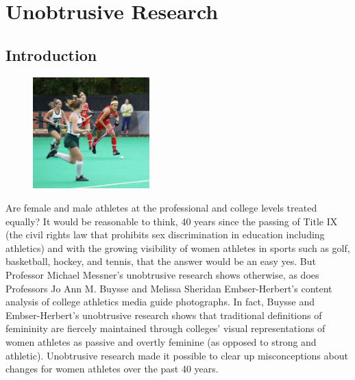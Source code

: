 \chapter{Unobtrusive Research}\label{ch12:unobtrusive}

\section{Introduction}

\begin{figure}
	\centering
	\includegraphics[width=0.4\textwidth]{gfx/12-women_hockey} 
\end{figure}

Are female and male athletes at the professional and college levels treated equally? It would be reasonable to think, 40 years since the passing of Title IX (the civil rights law that prohibits sex discrimination in education including athletics) and with the growing visibility of women athletes in sports such as golf, basketball, hockey, and tennis, that the answer would be an easy yes. But Professor Michael Messner's \cite{messner2002taking} unobtrusive research shows otherwise, as does Professors Jo Ann M. Buysse and Melissa Sheridan Embser-Herbert's \cite{buysse2004constructions} content analysis of college athletics media guide photographs. In fact, Buysse and Embser-Herbert's unobtrusive research shows that traditional definitions of femininity are fiercely maintained through colleges' visual representations of women athletes as passive and overtly feminine (as opposed to strong and athletic). Unobtrusive research made it possible to clear up misconceptions about changes for women athletes over the past 40 years.

